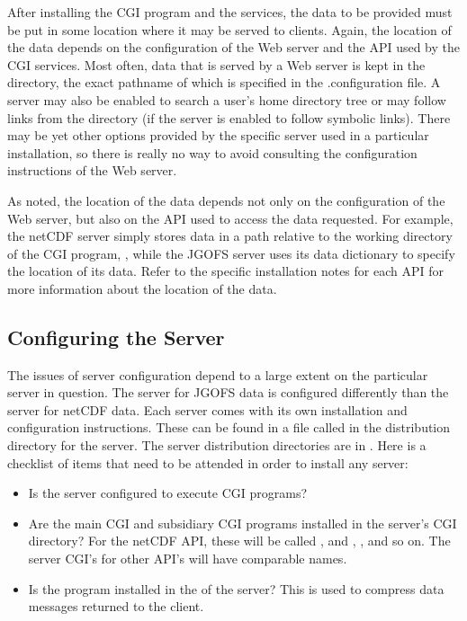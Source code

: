 After installing the CGI program and the services, the data to be
provided must be put in some location where it may be served to
clients. Again, the location of the data depends on the configuration
of the Web server and the API used by the CGI services. Most often,
data that is served by a Web server is kept in the 
directory, the exact pathname of which is specified in the
.configuration file. A server may also be enabled to search
a user's home directory tree or may follow links from the 
directory (if the server is enabled to follow symbolic links). There
may be yet other options provided by the specific server used in a
particular installation, so there is really no way to avoid consulting
the configuration instructions of the Web server.

As noted, the location of the data depends not only on the
configuration of the Web server, but also on the API used to access
the data requested.  For example, the netCDF server simply
stores data in a path relative to the working directory of the CGI
program, , while the JGOFS server uses its data
dictionary to specify the location of its data. Refer to the specific
installation notes for each API for more information about the
location of the data.

\subsection{Configuring the Server}

The issues of server configuration depend to a large extent on the
particular server in question.  The \opendap server for JGOFS data is
configured differently than the \opendap server for netCDF data.  Each
server comes with its own installation and configuration instructions.
These can be found in a file called  in the distribution
directory for the server.  The server distribution directories are in
.  Here is a checklist of items that need to be
attended in order to install any \opendap server:    

\begin{itemize}
\item Is the  server configured to execute CGI programs?
  
\item Are the main CGI and subsidiary CGI programs installed in the
  server's CGI directory?  For the netCDF API, these will be called
  , and , , and so on.  The
  server CGI's for other API's will have comparable names.
  
\item Is the  program installed in the  of the
   server?  This is used to compress data messages returned
  to the client.

\end{itemize}

